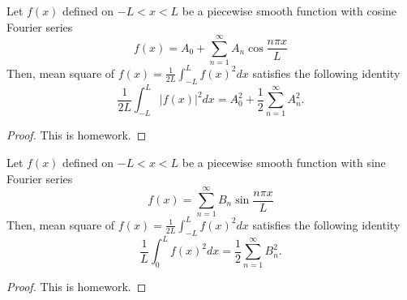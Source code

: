 \begin{theorem} Let $f(x)$ defined on $-L<x<L$ be a piecewise smooth function with cosine Fourier series 
    \begin{equation}\label{eq.Parseval_cosine_assumption}
        f(x)=A_0 + \sum_{n=1}^{\infty} A_n \cos \frac{n \pi x}{L}
    \end{equation}
    Then, mean square of $f(x)=\frac{1}{2 L} \int_{-L}^L f(x)^2 d x$ satisfies the following identity
    \begin{equation}\label{eq.Parseval_cosine}
        \frac{1}{2 L} \int_{-L}^L |f(x)|^2 d x=A_0^2 + \frac{1}{2}\sum_{n=1}^{\infty}A_n^2 .
    \end{equation}
\end{theorem}
\begin{proof}
    This is homework.
\end{proof}

\begin{theorem}
    Let $f(x)$ defined on $-L<x<L$ be a piecewise smooth function with sine Fourier series 
    \begin{equation}\label{eq.Parseval_sine_assumption}
        f(x)=\sum_{n=1}^{\infty} B_n \sin \frac{n \pi x}{L}
    \end{equation}
    Then, mean square of $f(x)=\frac{1}{2 L} \int_{-L}^L f(x)^2 d x$ satisfies the following identity
    \begin{equation}\label{eq.Parseval_sine}
        \frac{1}{L} \int_{0}^L f(x)^2 d x=\frac{1}{2}\sum_{n=1}^{\infty} B_n^2 .
    \end{equation}
\end{theorem}
\begin{proof}
    This is homework.
\end{proof}
